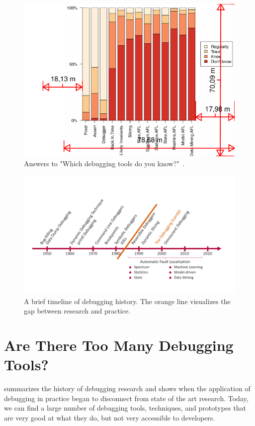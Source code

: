 \begin{figure}[th]
\centering
\includegraphics[width=.8\linewidth]{img/tool-usage}
\caption{Answers to "Which debugging tools do you know?"~\cite{perscheid17:studying_the_advancement}.}
\label{fig:tool-usage}
\end{figure}

\begin{figure}[th]
\centering
\includegraphics[width=\linewidth]{img/debugging-timeline}
\caption{A brief timeline of debugging history. The orange line visualizes the gap between research and practice.}
\label{fig:debugging-timeline}
\end{figure}

\section{Are There Too Many Debugging Tools?}

 summarizes the history of debugging research and shows when the application of debugging in practice began to disconnect from state of the art research.
Today, we can find a large number of debugging tools, techniques, and prototypes that are very good at what they do, but not very accessible to developers.

